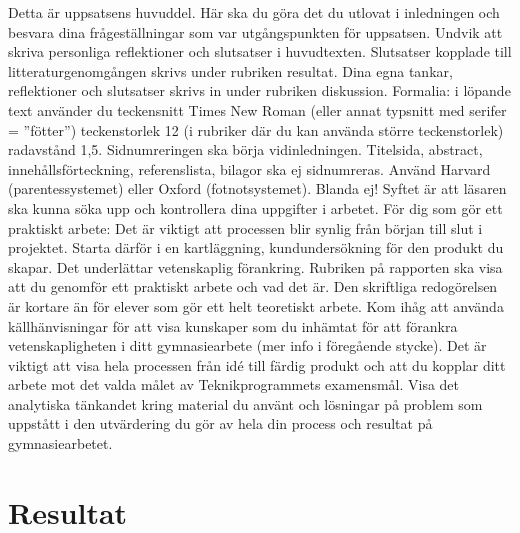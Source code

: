 \documentclass[12pt, a4paper]{article}
\begin{document}
	\begin{small}
		Detta är uppsatsens huvuddel. Här ska du göra det du utlovat i inledningen och
besvara dina frågeställningar som var utgångspunkten för uppsatsen. Undvik
att skriva personliga reflektioner och slutsatser i huvudtexten. Slutsatser
kopplade till litteraturgenomgången skrivs under rubriken resultat. Dina egna
tankar, reflektioner och slutsatser skrivs in under rubriken diskussion.
Formalia: i löpande text använder du teckensnitt Times New Roman (eller
annat typsnitt med serifer = ”fötter”) teckenstorlek 12 (i rubriker där du kan
använda större teckenstorlek) radavstånd 1,5. Sidnumreringen ska börja vidinledningen. Titelsida, abstract, innehållsförteckning, referenslista, bilagor ska
ej sidnumreras. Använd Harvard (parentessystemet) eller Oxford
(fotnotsystemet). Blanda ej! Syftet är att läsaren ska kunna söka upp och
kontrollera dina uppgifter i arbetet.
För dig som gör ett praktiskt arbete:
Det är viktigt att processen blir synlig från början till slut i projektet. Starta
därför i en kartläggning, kundundersökning för den produkt du skapar. Det
underlättar vetenskaplig förankring.
Rubriken på rapporten ska visa att du genomför ett praktiskt arbete och vad
det är. Den skriftliga redogörelsen är kortare än för elever som gör ett helt
teoretiskt arbete. Kom ihåg att använda källhänvisningar för att visa kunskaper
som du inhämtat för att förankra vetenskapligheten i ditt gymnasiearbete (mer
info i föregående stycke). Det är viktigt att visa hela processen från idé till
färdig produkt och att du kopplar ditt arbete mot det valda målet av
Teknikprogrammets examensmål. Visa det analytiska tänkandet kring material
du använt och lösningar på problem som uppstått i den utvärdering du gör av
hela din process och resultat på gymnasiearbetet.
	\end{small}
	
	\newpage
	\section{Resultat}
	
\end{document}
